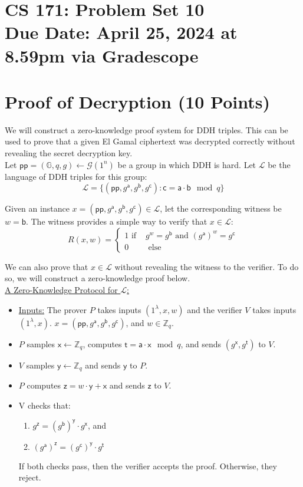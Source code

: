 \documentclass[11pt]{article}
\newcommand{\cL}{\mathcal{L}}
\newcommand{\GG}{\mathbb{G}}
\newcommand{\pp}{\mathsf{pp}}
\newcommand{\ZZ}{\mathbb{Z}}
\newcommand{\sfa}{\mathsf{a}}
\newcommand{\sfb}{\mathsf{b}}
\newcommand{\sfc}{\mathsf{c}}
\newcommand{\sft}{\mathsf{t}}
\newcommand{\sfx}{\mathsf{x}}
\newcommand{\sfy}{\mathsf{y}}
\newcommand{\sfz}{\mathsf{z}}
\newcommand{\secp}{\lambda}
\newcommand{\duedate}{April 25, 2024 at 8.59pm via Gradescope}
\numberwithin{equation}{section}
\begin{document}
\section*{CS 171: Problem Set 10\\ {\small Due Date: \duedate} }

\section{Proof of Decryption (10 Points)}
We will construct a zero-knowledge proof system for DDH triples. This can be used to prove that a given El Gamal ciphertext was decrypted correctly without revealing the secret decryption key.\\

Let $\pp = (\GG, q, g) \leftarrow \mathcal{G}(1^n)$ be a group in which DDH is hard. Let $\cL$ be the language of DDH triples for this group:
\[\cL = \{(\pp, g^\sfa, g^\sfb, g^\sfc) : \sfc = \sfa \cdot \sfb \mod q\}\]

Given an instance $x = (\pp, g^\sfa, g^\sfb, g^\sfc) \in \cL$, let the corresponding witness be $w = \sfb$. The witness provides a simple way to verify that $x \in \cL$:
\[R(x, w) = 
\begin{cases}
    1 \text{ if } & g^{w} = g^\sfb \text{ and } (g^\sfa)^w = g^{\sfc}\\
    0 & \text{ else }
\end{cases}\]

We can also prove that $x \in \cL$ without revealing the witness to the verifier. To do so, we will construct a zero-knowledge proof below.\\

\noindent\underline{A Zero-Knowledge Protocol for $\cL$:}
\begin{itemize}
    \item \underline{Inputs:} The prover $P$ takes inputs $(1^\secp, x, w)$ and the verifier $V$ takes inputs $(1^\secp, x)$. $x = (\pp, g^\sfa, g^\sfb, g^\sfc)$, and $w \in \ZZ_q$.
    \item $P$ samples $\sfx \leftarrow \ZZ_q$, computes $\sft = \sfa \cdot \sfx \mod q$, and sends $(g^\sfx,g^{\sft})$ to $V$. 
    \item $V$ samples $\sfy \leftarrow \mathbb{Z}_q$ and sends $\sfy$ to $P$.
    \item $P$ computes $\sfz = w \cdot \sfy + \sfx$ and sends $\sfz$ to $V$.
    \item V checks that:
    \begin{enumerate}
        \item $g^\sfz = (g^\sfb)^\sfy \cdot g^\sfx$, and 
        \item $(g^\sfa)^\sfz = (g^{\sfc})^\sfy \cdot g^{\sft}$
    \end{enumerate}
    If both checks pass, then the verifier accepts the proof. Otherwise, they reject.
\end{itemize}
\end{document}
